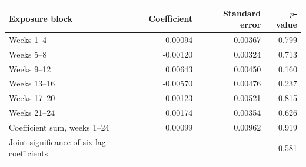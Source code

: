 \begin{tabular}{lrrr}
\toprule
Exposure block & Coefficient & Standard error & $p$-value \\
\midrule
Weeks 1--4 & 0.00094 & 0.00367 & 0.799 \\
Weeks 5--8 & -0.00120 & 0.00324 & 0.713 \\
Weeks 9--12 & 0.00643 & 0.00450 & 0.160 \\
Weeks 13--16 & -0.00570 & 0.00476 & 0.237 \\
Weeks 17--20 & -0.00123 & 0.00521 & 0.815 \\
Weeks 21--24 & 0.00174 & 0.00354 & 0.626 \\
Coefficient sum, weeks 1--24 & 0.00099 & 0.00962 & 0.919 \\
\midrule
Joint significance of six lag coefficients & -- & -- & 0.581 \\
\bottomrule
\end{tabular}
